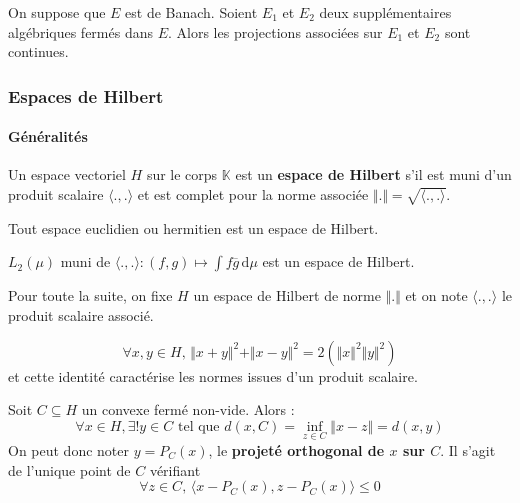 	\begin{corollary}
		On suppose que $E$ est de Banach. Soient $E_1$ et $E_2$ deux supplémentaires algébriques fermés dans $E$. Alors les projections associées sur $E_1$ et $E_2$ sont continues.
	\end{corollary}

	\subsubsection{Espaces de Hilbert}

	\paragraph{Généralités}


	\begin{definition}
		Un espace vectoriel $H$ sur le corps $\mathbb{K}$ est un \textbf{espace de Hilbert} s'il est muni d'un produit scalaire $\langle . , . \rangle$ et est complet pour la norme associée $\Vert . \Vert = \sqrt{\langle . , . \rangle}$.
	\end{definition}

	\begin{example}
		Tout espace euclidien ou hermitien est un espace de Hilbert.
	\end{example}

	\begin{example}
		$L_2(\mu)$ muni de $\langle . , . \rangle : (f,g) \mapsto \int f \overline{g} \, \mathrm{d}\mu$ est un espace de Hilbert.
	\end{example}

	Pour toute la suite, on fixe $H$ un espace de Hilbert de norme $\Vert . \Vert$ et on note $\langle ., . \rangle$ le produit scalaire associé.

	\begin{lemma}
		\[ \forall x, y \in H, \, \Vert x + y \Vert^2 + \Vert x - y \Vert^2 = 2(\Vert x \Vert^2 \Vert y \Vert^2) \]
		et cette identité caractérise les normes issues d'un produit scalaire.
	\end{lemma}


	\begin{theorem}
		Soit $C \subseteq H$ un convexe fermé non-vide. Alors :
		\[ \forall x \in H, \exists! y \in C \text{ tel que } d(x, C) = \inf_{z \in C} \Vert x - z \Vert = d(x, y) \]
		On peut donc noter $y = P_C(x)$, le \textbf{projeté orthogonal de $x$ sur $C$}. Il s'agit de l'unique point de $C$ vérifiant
		\[ \forall z \in C, \, \langle x - P_C(x), z - P_C(x) \rangle \leq 0 \]
	\end{theorem}

